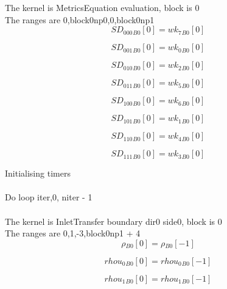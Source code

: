 \documentclass{article}
\begin{document}
\noindent The kernel is MetricsEquation evaluation, block is 0\\\noindent The ranges are 0,block0np0,0,block0np1\\\begin{dmath}{SD_{000}{_{B0}}}[{0}] = {wk_{7}{_{B0}}}[{0}]\end{dmath}

\begin{dmath}{SD_{001}{_{B0}}}[{0}] = {wk_{0}{_{B0}}}[{0}]\end{dmath}

\begin{dmath}{SD_{010}{_{B0}}}[{0}] = {wk_{2}{_{B0}}}[{0}]\end{dmath}

\begin{dmath}{SD_{011}{_{B0}}}[{0}] = {wk_{5}{_{B0}}}[{0}]\end{dmath}

\begin{dmath}{SD_{100}{_{B0}}}[{0}] = {wk_{6}{_{B0}}}[{0}]\end{dmath}

\begin{dmath}{SD_{101}{_{B0}}}[{0}] = {wk_{1}{_{B0}}}[{0}]\end{dmath}

\begin{dmath}{SD_{110}{_{B0}}}[{0}] = {wk_{4}{_{B0}}}[{0}]\end{dmath}

\begin{dmath}{SD_{111}{_{B0}}}[{0}] = {wk_{3}{_{B0}}}[{0}]\end{dmath}

\noindent Initialising timers\\
\\\noindent Do loop iter,0, niter - 1\\
\\\noindent The kernel is InletTransfer boundary dir0 side0, block is 0\\\noindent The ranges are 0,1,-3,block0np1 + 4\\\begin{dmath}{\rho{_{B0}}}[{0}] = {\rho{_{B0}}}[{-1}]\end{dmath}

\begin{dmath}{rhou_{0}{_{B0}}}[{0}] = {rhou_{0}{_{B0}}}[{-1}]\end{dmath}

\begin{dmath}{rhou_{1}{_{B0}}}[{0}] = {rhou_{1}{_{B0}}}[{-1}]\end{dmath}
\end{document}
